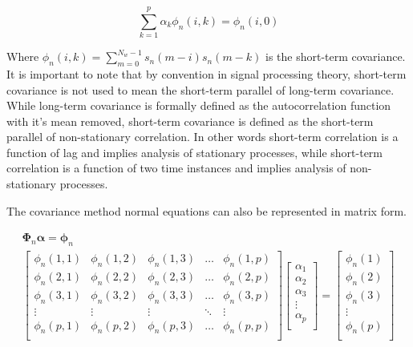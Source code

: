  \begin{equation}
 	\sum_{k=1}^{p} \alpha_k \phi_n(i,k) = \phi_n(i,0)
 \end{equation}
 
 \noindent
 Where $\phi_n(i,k) = \sum_{m=0}^{N_w-1} s_n(m-i) s_n(m-k)$ is the short-term covariance. It is important to note that by convention in signal processing theory, short-term covariance is not used to mean the short-term parallel of long-term covariance. While long-term covariance is formally defined as the autocorrelation function with it's mean removed, short-term covariance is defined as the short-term parallel of non-stationary correlation. In other words short-term correlation is a function of lag and implies analysis of stationary processes, while short-term correlation is a function of two time instances and implies analysis of non-stationary processes.
 
 The covariance method normal equations can also be represented in matrix form.
 
 \begin{eqnarray}
 	\boldsymbol{\Phi}_n \boldsymbol{\alpha} = \boldsymbol{\phi}_n \\
 	\begin{bmatrix} 
 		\phi_n(1,1)   & \phi_n(1,2)   & \phi_n(1,3)     & \dots    & \phi_n(1,p)  \\
 		\phi_n(2,1)   & \phi_n(2,2)  & \phi_n(2,3)     & \dots     & \phi_n(2,p)  \\
 		\phi_n(3,1)   & \phi_n(3,2)  & \phi_n(3,3)     & \dots    & \phi_n(3,p)  \\
 		\vdots      & \vdots      & \vdots          & \ddots  & \vdots  \\
 		\phi_n(p,1)  & \phi_n(p,2)  & \phi_n(p,3)      & \dots    & \phi_n(p,p)  \\
 	\end{bmatrix} 
 	\begin{bmatrix}
 		\alpha_1 \\
 		\alpha_2 \\
 		\alpha_3 \\
 		\vdots    \\
 		\alpha_p \\
 	\end{bmatrix}
 	=
 	\begin{bmatrix}
 		\phi_n(1)  \\
 		\phi_n(2) \\
 		\phi_n(3) \\
 		\vdots    \\
 		\phi_n(p) \\
 	\end{bmatrix}
 \end{eqnarray}
 
